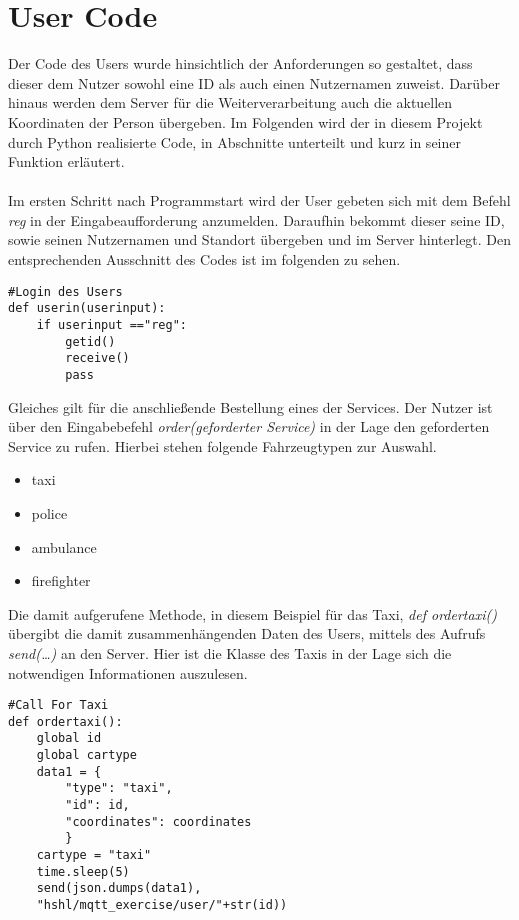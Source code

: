 \section{User Code}\label{usercode}
Der Code des Users wurde hinsichtlich der Anforderungen so gestaltet, dass dieser dem Nutzer sowohl eine ID als auch einen Nutzernamen zuweist. Darüber hinaus werden dem Server für die Weiterverarbeitung auch die aktuellen Koordinaten der Person übergeben. Im Folgenden wird der in diesem Projekt durch Python realisierte Code, in Abschnitte unterteilt und kurz in seiner Funktion erläutert.\\
\\
Im ersten Schritt nach Programmstart wird der User gebeten sich mit dem Befehl \textit{reg} in der Eingabeaufforderung anzumelden. Daraufhin bekommt dieser seine ID, sowie seinen Nutzernamen und Standort übergeben und im Server hinterlegt. Den entsprechenden Ausschnitt des Codes ist im folgenden zu sehen.

\begin{lstlisting}
#Login des Users
def userin(userinput):
    if userinput =="reg":
        getid()
        receive()
        pass
\end{lstlisting}

Gleiches gilt für die anschließende Bestellung eines der Services. Der Nutzer ist über den Eingabebefehl \textit{order(geforderter Service)} in der Lage den geforderten Service zu rufen. Hierbei stehen folgende Fahrzeugtypen zur Auswahl.

\begin{itemize}

	\item taxi
	\item police
	\item ambulance
	\item firefighter

\end{itemize}

Die damit aufgerufene Methode, in diesem Beispiel für das Taxi, \textit{def ordertaxi()} übergibt die damit zusammenhängenden Daten des Users, mittels des Aufrufs \textit{send(…)} an den Server.
Hier ist die Klasse des Taxis in der Lage sich die notwendigen Informationen auszulesen.

\begin{lstlisting}
#Call For Taxi
def ordertaxi():
    global id
    global cartype
    data1 = {
        "type": "taxi",
        "id": id,
        "coordinates": coordinates
        }
    cartype = "taxi"
    time.sleep(5)
    send(json.dumps(data1),
    "hshl/mqtt_exercise/user/"+str(id))
\end{lstlisting}

